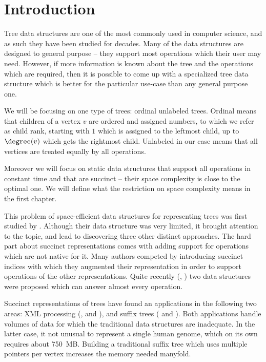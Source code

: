 \chapter*{Introduction}

Tree data structures are one of the most commonly used in computer science, and as such they have been studied for decades.
Many of the data structures are designed to general purpose -- they support most operations which their user may need.
However, if more information is known about the tree and the operations which are required, then it is possible to come up with a specialized tree data structure which is better for the particular use-case than any general purpose one.

We will be focusing on one type of trees: ordinal unlabeled trees.
Ordinal means that children of a vertex $v$ are ordered and assigned numbers, to which we refer as child rank, starting with $1$ which is assigned to the leftmost child, up to $\degree(v)$ which gets the rightmost child.
Unlabeled in our case means that all vertices are treated equally by all operations.

Moreover we will focus on static data structures that support all operations in constant time and that are succinct -- their space complexity is close to the optimal one.
We will define what the restriction on space complexity means in the first chapter.

\bigbreak

This problem of space-efficient data structures for representing trees was first studied by \cite{jacobson1989space}.
Although their data structure was very limited, it brought attention to the topic, and lead to discovering three other distinct approaches.
The hard part about succinct representations comes with adding support for operations which are not native for it.
Many authors competed by introducing succinct indices with which they augmented their representation in order to support operations of the other representations.
Quite recently (\cite{farzan2008uniform}, \cite{sadakane2010fully}) two data structures were proposed which can answer almost every operation.

Succinct representations of trees have found an applications in the following two areas: XML processing (\cite{geary2006succinct},\cite{lu2008balanced} and \cite{delpratt2008engineering}), and suffix trees (\cite{jansson2012ultra} and \cite{munro2001space}).
Both applications handle volumes of data for which the traditional data structures are inadequate.
In the latter case, it not unusual to represent a single human genome, which on its own requires about 750~MB.
Building a traditional suffix tree which uses multiple pointers per vertex increases the memory needed manyfold.

